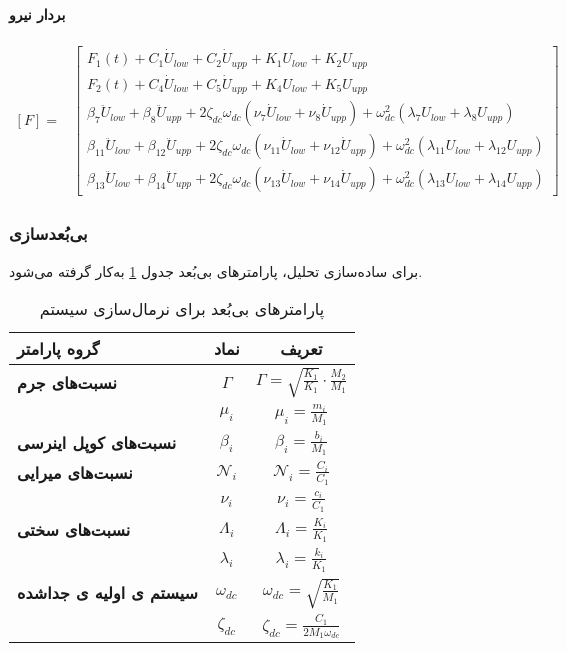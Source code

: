 \paragraph{بردار نیرو}
\begin{equation}\label{Eq.force_vector_dimensional_combined}
\begin{aligned}
[F] = & \begin{bmatrix}
F_1(t) + C_1 \dot{U}_{low} + C_2 \dot{U}_{upp} + K_1 U_{low} + K_2 U_{upp} \\
F_2(t) + C_4 \dot{U}_{low} + C_5 \dot{U}_{upp} + K_4 U_{low} + K_5 U_{upp} \\
\beta_7 \ddot{U}_{low} + \beta_8 \ddot{U}_{upp} + 2 \zeta_{dc} \omega_{dc} (\nu_7 \dot{U}_{low} + \nu_8 \dot{U}_{upp}) + \omega_{dc}^2 (\lambda_7 U_{low} + \lambda_8 U_{upp}) \\
\beta_{11} \ddot{U}_{low} + \beta_{12} \ddot{U}_{upp} + 2 \zeta_{dc} \omega_{dc} (\nu_{11} \dot{U}_{low} + \nu_{12} \dot{U}_{upp}) + \omega_{dc}^2 (\lambda_{11} U_{low} + \lambda_{12} U_{upp}) \\
\beta_{13} \ddot{U}_{low} + \beta_{14} \ddot{U}_{upp} + 2 \zeta_{dc} \omega_{dc} (\nu_{13} \dot{U}_{low} + \nu_{14} \dot{U}_{upp}) + \omega_{dc}^2 (\lambda_{13} U_{low} + \lambda_{14} U_{upp})
\end{bmatrix}
\end{aligned}
\end{equation}

\subsubsection{بی‌بُعدسازی}
برای ساده‌سازی تحلیل، پارامترهای بی‌بُعد جدول \ref{Tab:dimensionless.table} به‌کار گرفته می‌شود.
\begin{table}[h!]
\centering
\caption{پارامترهای بی‌بُعد برای نرمال‌سازی سیستم}
\label{Tab:dimensionless.table}
\begin{tabular}{lcc}
\toprule
\textbf{گروه پارامتر} & \textbf{نماد} & \textbf{تعریف} \\
\midrule
\textbf{نسبت‌های جرم} & $\Gamma$ & $\Gamma = \sqrt{\tfrac{K_1}{K_1}}\cdot\tfrac{M_2}{M_1}$ \\
 & $\mu_i$ & $\mu_i = \tfrac{m_i}{M_1}$ \\
\addlinespace
\textbf{نسبت‌های کوپل اینرسی} & $\beta_i$ & $\beta_i = \tfrac{b_i}{M_1}$ \\
\addlinespace
\textbf{نسبت‌های میرایی} & $\mathcal{N}_i$ & $\mathcal{N}_i = \tfrac{C_i}{C_1}$ \\
 & $\nu_i$ & $\nu_i = \tfrac{c_i}{C_1}$ \\
\addlinespace
\textbf{نسبت‌های سختی} & $\Lambda_i$ & $\Lambda_i = \tfrac{K_i}{K_1}$ \\
 & $\lambda_i$ & $\lambda_i = \tfrac{k_i}{K_1}$ \\
\addlinespace
\textbf{سیستم ی اولیه ی جداشده} & $\omega_{dc}$ & $\omega_{dc} = \sqrt{\tfrac{K_1}{M_1}}$ \\
 & $\zeta_{dc}$ & $\zeta_{dc} = \tfrac{C_1}{2 M_1 \omega_{dc}}$ \\
\bottomrule
\end{tabular}
\end{table}

